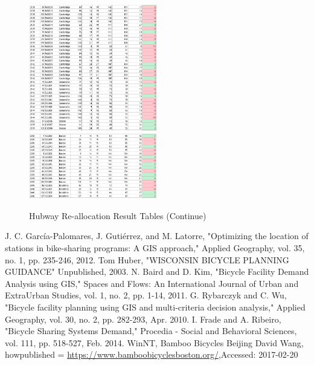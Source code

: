 \documentclass[journal, letterpaper]{IEEEtran}
\begin{document}
\begin{figure}
  \includegraphics[width=0.5\textwidth]{reall3.png}
  \includegraphics[width=0.5\textwidth]{reall4.png}
  \caption{Hubway Re-allocation Result Tables (Continue)}
  \label{fig:5}
\end{figure}

\begin{thebibliography}{99}

 J. C. García-Palomares, J. Gutiérrez, and M. Latorre, "Optimizing the location of stations in bike-sharing programs: A GIS approach," Applied Geography, vol. 35, no. 1, pp. 235-246, 2012.
 Tom Huber, "WISCONSIN BICYCLE PLANNING GUIDANCE" Unpublished, 2003.
 N. Baird and D. Kim, "Bicycle Facility Demand Analysis using GIS," Spaces and Flows: An International Journal of Urban and ExtraUrban Studies, vol. 1, no. 2, pp. 1-14, 2011.
 G. Rybarczyk and C. Wu, "Bicycle facility planning using GIS and multi-criteria decision analysis," Applied Geography, vol. 30, no. 2, pp. 282-293, Apr. 2010.
 I. Frade and A. Ribeiro, "Bicycle Sharing Systems Demand," Procedia - Social and Behavioral Sciences, vol. 111, pp. 518-527, Feb. 2014.
  {WinNT, {{ Bamboo Bicycles Beijing} David Wang}, howpublished = {\url{https://www.bamboobicyclesboston.org/}},{Accessed: 2017-02-20}}
 
\end{thebibliography}
\end{document}
